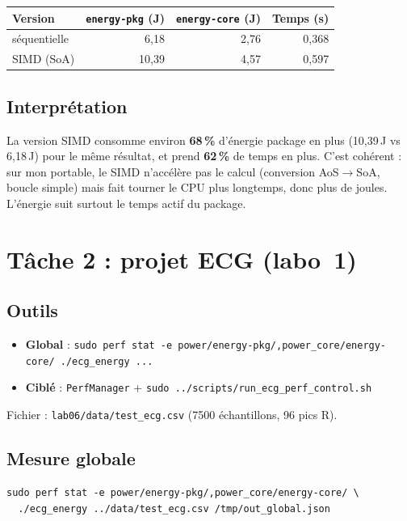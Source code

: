 \documentclass[a4paper,12pt]{article}
\begin{document}
\begin{center}
\begin{tabular}{|l|r|r|r|}
\hline
Version & \texttt{energy-pkg} (J) & \texttt{energy-core} (J) & Temps (s) \\
\hline
séquentielle & 6{,}18 & 2{,}76 & 0{,}368 \\
SIMD (SoA) & 10{,}39 & 4{,}57 & 0{,}597 \\
\hline
\end{tabular}
\end{center}

\subsection{Interprétation}
La version SIMD consomme environ \textbf{68\,\%} d'énergie package en plus (10{,}39\,J vs 6{,}18\,J) pour le même résultat, et prend \textbf{62\,\%} de temps en plus. C'est cohérent : sur mon portable, le SIMD n'accélère pas le calcul (conversion AoS$\rightarrow$SoA, boucle simple) mais fait tourner le CPU plus longtemps, donc plus de joules. L'énergie suit surtout le temps actif du package.

\section{Tâche 2 : projet ECG (labo~1)}

\subsection{Outils}
\begin{itemize}
    \item \textbf{Global} : \texttt{sudo perf stat -e power/energy-pkg/,power\_core/energy-core/ ./ecg\_energy ...}
    \item \textbf{Ciblé} : \texttt{PerfManager} + \texttt{sudo ../scripts/run\_ecg\_perf\_control.sh}
\end{itemize}

Fichier : \texttt{lab06/data/test\_ecg.csv} (7500 échantillons, 96 pics R).

\subsection{Mesure globale}
\begin{verbatim}
sudo perf stat -e power/energy-pkg/,power_core/energy-core/ \
  ./ecg_energy ../data/test_ecg.csv /tmp/out_global.json
\end{verbatim}
\end{document}
